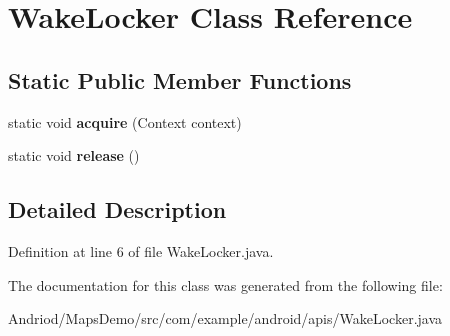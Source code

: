 \hypertarget{classcom_1_1example_1_1android_1_1apis_1_1_wake_locker}{\section{Wake\-Locker Class Reference}
\label{classcom_1_1example_1_1android_1_1apis_1_1_wake_locker}
}
\subsection*{Static Public Member Functions}
\begin{DoxyCompactItemize}
\item 
\hypertarget{classcom_1_1example_1_1android_1_1apis_1_1_wake_locker_a6f9a6a94f7774f14b7c517688456c779}{static void {\bfseries acquire} (Context context)}\label{classcom_1_1example_1_1android_1_1apis_1_1_wake_locker_a6f9a6a94f7774f14b7c517688456c779}

\item 
\hypertarget{classcom_1_1example_1_1android_1_1apis_1_1_wake_locker_a9e5d3fad9e601bb8c8c37183aaa737d2}{static void {\bfseries release} ()}\label{classcom_1_1example_1_1android_1_1apis_1_1_wake_locker_a9e5d3fad9e601bb8c8c37183aaa737d2}

\end{DoxyCompactItemize}


\subsection{Detailed Description}


Definition at line 6 of file Wake\-Locker.\-java.



The documentation for this class was generated from the following file\-:\begin{DoxyCompactItemize}
\item 
Andriod/\-Maps\-Demo/src/com/example/android/apis/Wake\-Locker.\-java\end{DoxyCompactItemize}
